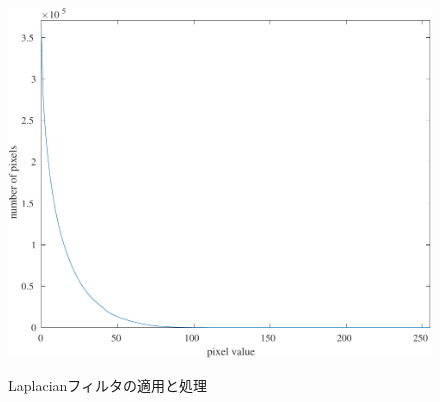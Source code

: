 \begin{figure}[H]
\begin{minipage}[b]{.3\textwidth}
    \end{minipage}
    \begin{minipage}[b]{.3\textwidth}
        \centering
        \includegraphics[keepaspectratio,width=\textwidth]{../../Figures/06_42_Thresholding-graph.pdf}
        \label{fig:Laplacianフィルタのヒストグラム}
    \end{minipage}
    \caption{Laplacianフィルタの適用と処理}
\end{figure}
